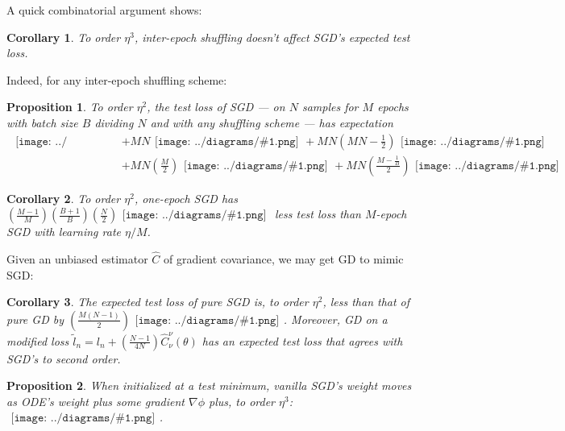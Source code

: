 \documentclass{article}
\newtheorem{cor}{Corollary}
\newtheorem{prop}{Proposition}
\newcommand{\wrap}[1]{\left(#1\right)}
\newcommand{\mdia}[1]{\begin{gathered}\texttt{[image: ../diagrams/\#1.png]}\end{gathered}}
\newcommand{\sdia}[1]{\begin{gathered}\texttt{[image: ../diagrams/\#1.png]}\end{gathered}}
\begin{document}
        A quick combinatorial argument shows:
        \begin{cor}
            To order $\eta^3$, inter-epoch shuffling doesn't affect SGD's
            expected test loss.
        \end{cor}
        Indeed, for any inter-epoch shuffling scheme: 
        \begin{prop}\label{prop:ordtwo}
            To order $\eta^2$, the test loss of SGD --- on $N$
            samples for $M$ epochs with batch size $B$ dividing $N$ and with any
            shuffling scheme --- has expectation
            {\small
            \begin{align*}
                                                        \mdia{(0)()}
                &+ MN                                   \mdia{(0-1)(01)}
                 + MN\wrap{MN - \frac{1}{2}}            \mdia{(0-1-2)(01-12)} \\
                &+ MN\wrap{\frac{M}{2}}                 \mdia{c(01-2)(02-12)}  
                 + MN\wrap{\frac{M-\frac{1}{B}}{2}}     \mdia{c(01-2)(01-12)}
            \end{align*}
            }
        \end{prop}
    
        \begin{cor}
            To order $\eta^2$, one-epoch SGD has 
            $
                 \wrap{\frac{M-1}{M}}\wrap{\frac{B+1}{B}}\wrap{\frac{N}{2}} \sdia{c(01-2)(01-12)}
            $
            less test loss than $M$-epoch SGD with learning rate $\eta/M$. 
        \end{cor}
    
        Given an unbiased estimator $\hat{C}$ of gradient covariance, we may get
        GD to mimic SGD:
        \begin{cor}
            The expected test loss of pure SGD is, to order $\eta^2$,
            less than that of pure GD by
            $
                  \wrap{\frac{M(N-1)}{2}} \sdia{c(01-2)(01-12)}
            $.
            Moreover, GD on a modified loss 
            $
                \tilde l_n = l_n + \wrap{\frac{N-1}{4N}} \hat{C}_\nu^\nu(\theta)
            $
            has an expected test loss that agrees with SGD's to second order.
        \end{cor}
    
        \begin{prop}
            When initialized at a test minimum, vanilla SGD's weight moves as ODE's
            weight plus some gradient $\nabla\phi$ plus, to order $\eta^3$: 
            $
                \sdia{c(01-2-3)(02-12-23)}
            $.
        \end{prop}
    
\end{document}
